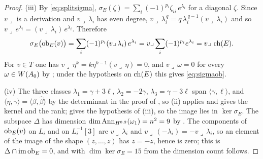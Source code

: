 \begin{proof}
(iii) By \eqref{eq:splitsigma}, $\sigma_{E}(\zeta)=\sum_{i}(-1)^{p_{i}}
\zeta_{ii}\,e^{\lambda_{i}}$ for a diagonal $\zeta$. Since $v\lrcorner$ is a
derivation and $v\lrcorner\,\lambda_{i}$ has even degree,
$v\lrcorner\,\lambda_{i}^{\,q}=q\,\lambda_{i}^{\,q-1}(v\lrcorner\,\lambda_{i})$
and so $v\lrcorner\,e^{\lambda_{i}}=(v\lrcorner\,\lambda_{i})\,e^{\lambda_{i}}$.
Therefore
\[
  \sigma_{E}\bigl(\operatorname{ob}_{E}(v)\bigr)
  =\sum_{i}(-1)^{p_{i}}(v\lrcorner\,\lambda_{i})\,e^{\lambda_{i}}
  =v\lrcorner\sum_{i}(-1)^{p_{i}}e^{\lambda_{i}}
  =v\lrcorner\,\operatorname{ch}(E).
\]
For $v\in T$ one has $v\lrcorner\,\eta^{k}=k\eta^{k-1}(v\lrcorner\,\eta)=0$,
and $v\lrcorner\,\omega=0$ for every $\omega\in W(A_{0})$ by
; under the hypothesis on $\operatorname{ch}(E)$ this gives
\eqref{eq:sigmaob}.

(iv) The three classes $\lambda_{1}=\gamma+3\ell$, $\lambda_{2}=-2\gamma$,
$\lambda_{3}=\gamma-3\ell$ span $\langle\gamma,\ell\rangle$, and
$\langle\eta,\gamma\rangle=\langle\beta,\widehat\beta\rangle$ by the
determinant in the proof of , so (ii) applies and
gives the kernel and the rank;  gives the
hypothesis of (iii), so the image lies in $\ker\sigma_{E}$. The subspace
$\Delta$ has dimension $\dim\operatorname{Ann}_{H^{0,2}}(\omega_{1})=n^{2}=9$ by
. The components of $\operatorname{ob}_{E}(v)$ on $L_{i}$ and on
$L_{i}^{-1}[3]$ are $v\lrcorner\,\lambda_{i}$ and
$v\lrcorner\,(-\lambda_{i})=-v\lrcorner\,\lambda_{i}$, so an element of the
image of the shape $(z,\dots,z)$ has $z=-z$, hence is zero; this is
$\Delta\cap\operatorname{im}\operatorname{ob}_{E}=0$, and with $\dim\ker\sigma_{E}=15$ from
 the dimension count follows.
\end{proof}


